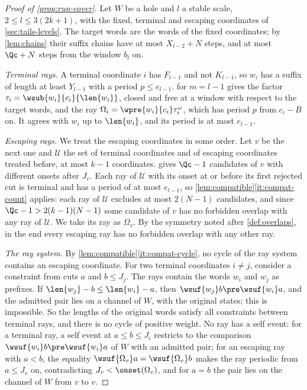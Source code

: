 \begin{proof}[Proof of \cref{prop:run-cover}]
Let $W$ be a hole and $l$ a stable scale, $2\le l\le3(2k+1)$, with the
fixed, terminal and escaping coordinates of \cref{sec:tails-levels}. The
target words are the words of the fixed coordinates; by \cref{lem:chains} their
suffix chains have at most $X_{l-2}+N$ steps, and at most $\Qc+N$ steps from
the window $b_l$ on.

\emph{Terminal rays.} A terminal coordinate $i$ has $F_{l-1}$ and not
$K_{l-1}$, so $w_i$ has a suffix of length at least $Y_{l-1}$ with a period
$p\le e_{l-1}$.  for $m=l-1$ gives the factor
$\tau_i=\wsub{w_i}{c_i}{\len{w_i}}$, closed and free at a window with
respect to the target words, and the ray $\Omega_i=\wpre{w_i}{c_i}\tau_i^\omega$,
which has period $p$ from $c_i-B$ on. It agrees with $w_i$ up to
$\len{w_i}$, and its period is at most $e_{l-1}$.

\emph{Escaping rays.} We treat the escaping coordinates in some order. Let
$v$ be the next one and $\mathcal U$ the set of terminal coordinates and of
escaping coordinates treated before, at most $k-1$ coordinates.
 gives $\Qc-1$ candidates of $v$ with different onsets
after $J_v$. Each ray of $\mathcal U$ with its onset at or before its first
rejected cut is terminal and has a period of at most $e_{l-1}$, so
\cref{lem:compatible}\eqref{it:compat-count} applies: each ray of
$\mathcal U$ excludes at most $2(N-1)$ candidates, and since
$\Qc-1>2(k-1)(N-1)$ some candidate of $v$ has no forbidden overlap with any
ray of $\mathcal U$. We take its ray as $\Omega_v$. By the symmetry noted
after \cref{def:overlaps}, in the end every escaping ray has no forbidden
overlap with any other ray.

\emph{The ray system.} By \cref{lem:compatible}\eqref{it:compat-cycle}, no
cycle of the ray system contains an escaping coordinate. For two terminal
coordinates $i\ne j$, consider a constraint from cuts $a$ and $b\le J_j$.
The rays contain the words $w_i$ and $w_j$ as prefixes. If
$\len{w_j}-b\le\len{w_i}-a$, then $\wsuf{w_j}b\pre\wsuf{w_i}a$, and the
admitted pair lies on a channel of $W$, with the original states; this is
impossible. So the lengths of the original words satisfy all constraints
between terminal rays, and there is no cycle of positive weight. No ray has
a self event: for a terminal ray, a self event at $a\le b\le J_i$ restricts
to the comparison $\wsuf{w_i}b\pre\wsuf{w_i}a$ of $W$ with an admitted pair;
for an escaping ray with $a<b$, the equality
$\wsuf{\Omega_v}a=\wsuf{\Omega_v}b$ makes the ray periodic from $a\le J_v$
on, contradicting $J_v<\onset(\Omega_v)$, and for $a=b$ the pair lies on the
channel of $W$ from $v$ to $v$.


\end{proof}
